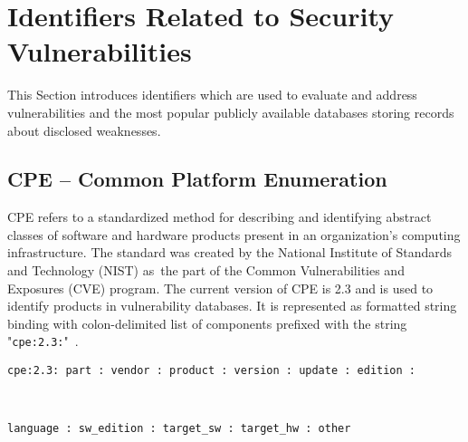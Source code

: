 
  \section{Identifiers Related to Security Vulnerabilities}
  This Section introduces identifiers which are used to evaluate and address vulnerabilities and the most popular
  publicly available databases storing records about disclosed weaknesses.

  \subsection*{CPE -- Common Platform Enumeration}
    CPE refers to a standardized method for describing and identifying abstract classes of software
    and hardware products present in an organization's computing infrastructure. The standard was created
    by the National Institute of Standards and Technology (NIST) as~the part of the Common Vulnerabilities
    and Exposures (CVE) program. The current version of CPE is 2.3 and is used to identify products
    in vulnerability databases. It is represented as formatted string binding with colon-delimited
    list of components prefixed with the string "\texttt{cpe:2.3:}"~\cite{CPEnaming}.\\
      \centerline{\texttt{cpe:2.3: part : vendor : product : version : update : edition :}}\\
      \centerline{\texttt{language : sw\_edition : target\_sw : target\_hw : other}}

